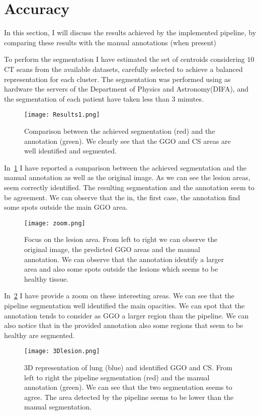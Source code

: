 \documentclass{standalone}
\begin{document}
	\section{Accuracy}
	
	In this section, I will discuss the results achieved by the implemented pipeline, by comparing these results with the manual annotations (when present)

	To perform the segmentation I have estimated the set of centroids considering $10$ CT scans from the available datasets, carefully selected to achieve a balanced representation for each cluster. The segmentation was performed using as hardware the servers of the Department of Physics and Astronomy(DIFA), and the segmentation of each patient have taken less than $3$ minutes.
	
	\begin{figure}[h!]
		\centering 
		\texttt{[image: Results1.png]}
		\caption{Comparison between the achieved segmentation (red) and the annotation (green). We clearly see that the GGO and CS areas are well identified and segmented.}\label{fig:Results}
	\end{figure}

	In \figurename\,\ref{fig:Results} I have reported a comparison between the achieved segmentation and the manual annotation as well as the original image. As we can see the lesion areas, seem correctly identified. The resulting segmentation and the annotation seem to be agreement. We can observe that the in, the first case, the annotation find some spots outside the main GGO area. 
	
	\begin{figure}[h!]
		\centering
			\texttt{[image: zoom.png]}
		\caption{Focus on the lesion area. From left to right we can observe the original image, the predicted GGO areas and the manual annotation. We can observe that the annotation identify a larger area and also some spots outside the lesions which seems to be healthy tissue.}\label{fig:zoom}
	\end{figure}

	In \figurename\,\ref{fig:zoom} I have provide a zoom on these interesting areas. We can see that the pipeline segmentation well identified the main opacities. We can spot that the annotation tends to consider as GGO a larger region than the pipeline. We can also notice that in the provided annotation also some regions that seem to be healthy are segmented.

	\begin{figure}[h!]	
		\centering 
			\texttt{[image: 3Dlesion.png]}
		\caption{3D representation of lung (blue) and identified GGO and CS. From left to right the pipeline segmentation (red) and the manual annotation (green). We can see that the two segmentation seems to agree. The area detected by the pipeline seems to be lower than the manual segmentation.}\label{fig:3Dlabel}		
	\end{figure}
	
\end{document}
